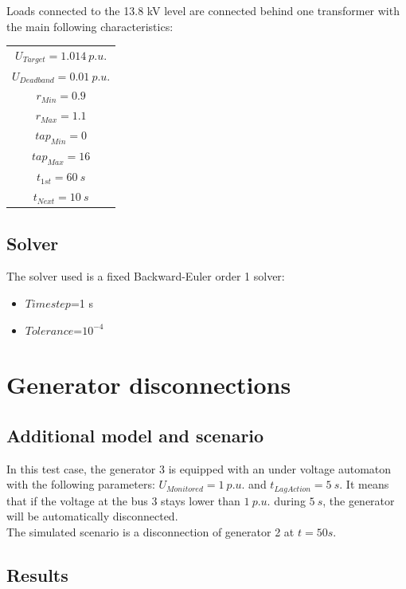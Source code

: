 \documentclass[a4paper, 12pt]{report}
\begin{document}
Loads connected to the 13.8 kV level are connected behind one transformer with the main following characteristics:

\begin{center}
\begin{tabular}{c}
   $U_{Target}=1.014 \ p.u. $  \\
   $U_{Deadband}=0.01 \ p.u. $ \\
   $r_{Min}=0.9 $ \\
   $r_{Max}=1.1 $ \\
   $tap_{Min}=0 $  \\
   $tap_{Max}=16 $ \\
   $t_{1st}=60 \ s $ \\
   $t_{Next}=10 \ s $  \\
\end{tabular}
\end{center}

\subsection{Solver}
The solver used is a fixed Backward-Euler order 1 solver:
\begin{itemize}
\item $Time step$=1 s
\item $Tolerance$=$10^{-4}$
\end{itemize}

\newpage
\section{Generator disconnections}

\subsection{Additional model and scenario}

In this test case, the generator 3 is equipped with an under voltage automaton with the following parameters: $U_{Monitored} = 1 \ p.u. $ and $t_{LagAction} = 5 \ s$. It means that if the voltage at the bus 3 stays lower than $1 \ p.u.$ during $5 \ s$, the generator will be automatically disconnected.\\

The simulated scenario is a disconnection of generator 2 at $ t = 50 s$.

\subsection{Results}
\end{document}
